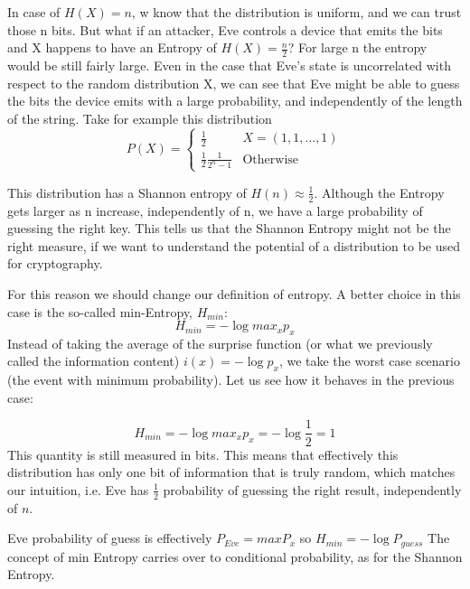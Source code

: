 In case of $H(X) = n$, w know that the distribution is uniform, and we can trust those n bits. But what if an attacker, Eve controls a device that emits the bits and X happens to have an Entropy of $H(X) = \frac{n}{2}$? For large n the entropy would be still fairly large. Even in the case that Eve's state is uncorrelated with respect to the random distribution X, we can see that Eve might be able to guess the bits the device emits with a large probability, and independently of the length of the string. Take for example this distribution
\begin{equation}
	\displaystyle P(X) = \begin{cases}
		\frac{1}{2}                   & \text{$X = (1,1, \dots, 1)$} \\
		\frac{1}{2} \frac{1}{2^n - 1} & \text{Otherwise}
	\end{cases}
\end{equation}

This distribution has a Shannon entropy of $H(n) \approx \frac{1}{2}$. Although the Entropy gets larger as n increase, independently of n, we have a large probability of guessing the right key. This tells us that the Shannon Entropy might not be the right measure, if we want to understand the potential of a distribution to be used for cryptography.

For this reason we should change our definition of entropy. A better choice in this case is the so-called min-Entropy, $H_{min}$:
\begin{equation}
	H_{min} = -\log max_x p_x
	\label{eq:minEntropy}
\end{equation}
Instead of taking the average of the surprise function (or what we previously called the information content) $i(x) = -\log p_x$, we take the worst case scenario (the event with minimum probability). Let us see how it behaves in the previous case:

\begin{equation}
	H_{min} = -\log max_x p_x = - \log \frac{1}{2} = 1
\end{equation}
This quantity is still measured in bits. This means that effectively this distribution has only one bit of information that is truly random, which matches our intuition, i.e. Eve has $\frac{1}{2}$ probability of guessing the right result, independently of $n$.

Eve probability of guess is effectively $P_{Eve} = max P_x$ so $H_{min} = -\log P_{guess}$
The concept of min Entropy carries over to conditional probability, as for the Shannon Entropy.

